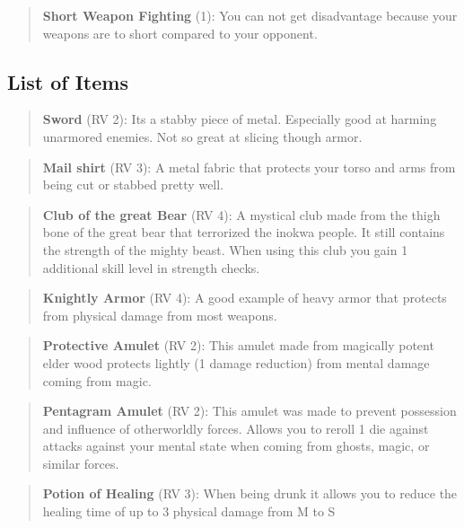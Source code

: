 \documentclass[11pt]{article}
\begin{document}
{\begin{multicols}{2}[]
\begin{quote}
\textbf{Short Weapon Fighting} (1): You can not get disadvantage because your weapons are to short compared to your opponent.
\end{quote}




\subsection{List of Items}
\label{sec:orga1df5a2}
\begin{quote}
\textbf{Sword} (RV 2): Its a stabby piece of metal. Especially good at harming unarmored enemies. Not so great at slicing though armor. 
\end{quote}

\begin{quote}
\textbf{Mail shirt} (RV 3): A metal fabric that protects your torso and arms from being cut or stabbed pretty well. 
\end{quote}

\begin{quote}
\textbf{Club of the great Bear} (RV 4): A mystical club made from the thigh bone of the great bear that terrorized the inokwa people. It still contains the strength of the mighty beast. When using this club you gain 1 additional skill level in strength checks.
\end{quote}

\begin{quote}
\textbf{Knightly Armor} (RV 4): A good example of heavy armor that protects from physical damage from most weapons.
\end{quote}

\begin{quote}
\textbf{Protective Amulet} (RV 2): This amulet made from magically potent elder wood protects lightly (1 damage reduction) from mental damage coming from magic.
\end{quote}

\begin{quote}
\textbf{Pentagram Amulet} (RV 2): This amulet was made to prevent possession and influence of otherworldly forces. Allows you to reroll 1 die against attacks against your mental state when coming from ghosts, magic, or similar forces.
\end{quote}

\begin{quote}
\textbf{Potion of Healing} (RV 3): When being drunk it allows you to reduce the healing time of up to 3 physical damage from M to S
\end{quote}


\end{multicols}}
\end{document}

